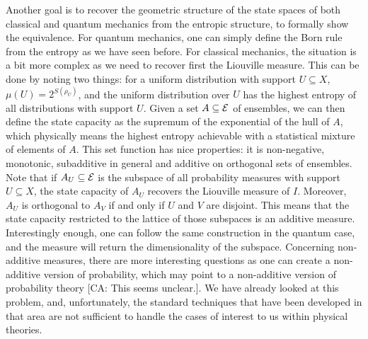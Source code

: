 Another goal is to recover the geometric structure of the state spaces of both classical and quantum mechanics from the entropic structure, to formally show the equivalence. For quantum mechanics, one can simply define the Born rule from the entropy as we have seen before. For classical mechanics, the situation is a bit more complex as we need to recover first the Liouville measure. This can be done by noting two things: for a uniform distribution with support $U \subseteq X$, $\mu(U) = 2^{S(\rho_U)}$, and the uniform distribution over $U$ has the highest entropy of all distributions with support $U$. Given a set $A \subseteq \mathcal{E}$ of ensembles, we can then define the state capacity as the supremum of the exponential of the hull of $A$, which physically means the highest entropy achievable with a statistical mixture of elements of $A$. This set function has nice properties: it is non-negative, monotonic, subadditive in general and additive on orthogonal sets of ensembles. Note that if $A_U \subseteq \mathcal{E}$ is the subspace of all probability measures with support $U \subseteq X$, the state capacity of $A_U$ recovers the Liouville measure of $I$. Moreover, $A_U$ is orthogonal to $A_V$ if and only if $U$ and $V$ are disjoint. This means that the state capacity restricted to the lattice of those subspaces is an additive measure. Interestingly enough, one can follow the same construction in the quantum case, and the measure will return the dimensionality of the subspace. Concerning non-additive measures, there are more interesting questions as one can create a non-additive version of probability, which may point to a non-additive version of probability theory [CA: This seems unclear.]. We have already looked at this problem, and, unfortunately, the standard techniques that have been developed in that area are not sufficient to handle the cases of interest to us within physical theories.

